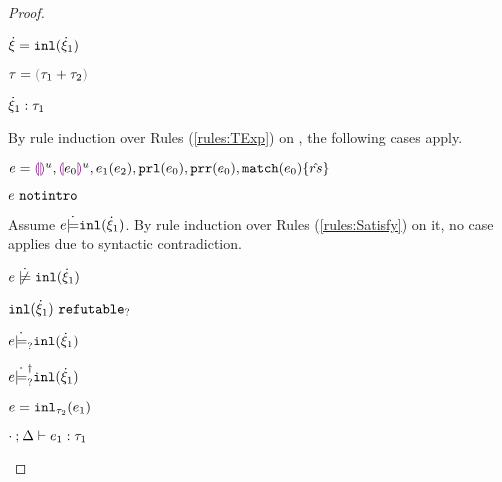 \begin{proof}
\begin{byCases}
\begin{byCases}
        
    \end{byCases}
\item[\text{(\ref{rule:CTInl})}]
    \begin{pfsteps*}
    \item $\dot{\xi}=\mathtt{inl}(\dot{\xi}_1)$ 
    \item $\tau=\tsum{\tau_1}{\tau_2}$ 
    \item $\dot{\xi}_1 : \tau_1$  
    \end{pfsteps*}
    By rule induction over Rules (\ref{rules:TExp}) on , the following cases apply.
    \begin{byCases}
    \item[\text{(\ref{rule:TEHole}),(\ref{rule:THole}),(\ref{rule:TAp}),(\ref{rule:TPrl}),(\ref{rule:TPrr}),(\ref{rule:TMatchZPre}),(\ref{rule:TMatchNZPre})}]
        \begin{pfsteps*}
        \item $e=\textcolor{violet}{\llparenthesis}\textcolor{violet}{\rrparenthesis}^{u},\textcolor{violet}{\llparenthesis} e_0\textcolor{violet}{\rrparenthesis}^{u},e_1(e_2),\mathtt{prl}(e_0),\mathtt{prr}(e_0),\mathtt{match}(e_0) \{\hat{rs}\}$ 
        \item $e ~\mathtt{notintro}$  
        \end{pfsteps*}
        Assume $e \dot{\models} \mathtt{inl}(\dot{\xi}_1)$. By rule induction over Rules (\ref{rules:Satisfy}) on it, no case applies due to syntactic contradiction.
        \begin{pfsteps*}
        \item $\cnotsatisfy{e}{\cinl{\hxi_1}}$  
        \item $\mathtt{inl}(\dot{\xi}_1) ~\mathtt{refutable}_?$  
        \item $e \dot{\models}_{?} \mathtt{inl}(\dot{\xi}_1)$  
        \item $e \dot{\models}_{?}^{\dag} \mathtt{inl}(\dot{\xi}_1)$ 
        \end{pfsteps*}
    \item[\text{(\ref{rule:TInl})}]
        \begin{pfsteps*}
        \item $e=\mathtt{inl}_{\tau_2}({e_1})$ 
        \item $\cdot \mathbin{;} \Delta \vdash e_1 : \tau_1$  

\end{pfsteps*}
\end{byCases}
\end{byCases}
\end{proof}
